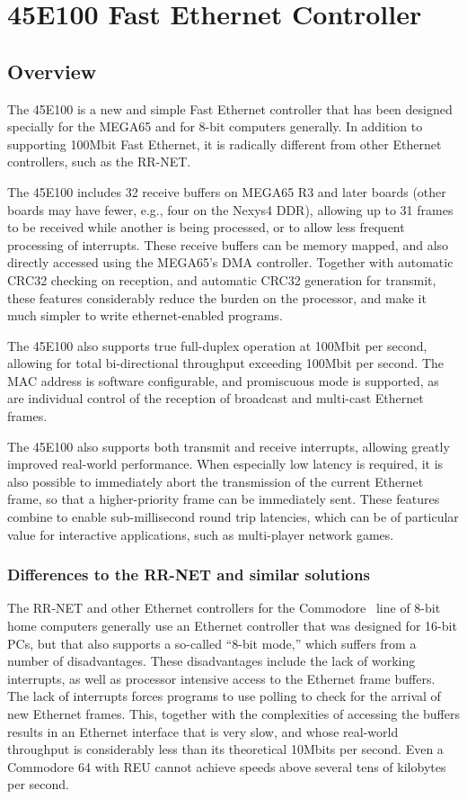 \chapter{45E100 Fast Ethernet Controller}

\section{Overview}

The 45E100 is a new and simple Fast Ethernet controller that has been
designed specially for the MEGA65 and for 8-bit computers generally.
In addition to supporting 100Mbit Fast Ethernet, it is radically
different from other Ethernet controllers, such as the RR-NET.

The 45E100 includes 32 receive buffers on MEGA65 R3 and later boards (other boards may have fewer, e.g., four on the Nexys4 DDR), allowing up to 31 frames to be
received while another is being processed, or to allow less frequent processing of interrupts.
These receive buffers can be memory mapped, and also directly accessed using the MEGA65's DMA controller.
Together with automatic CRC32 checking on reception, and automatic CRC32 generation for transmit, these features considerably
reduce the burden on the processor, and make it much simpler to write ethernet-enabled programs.

The 45E100 also supports true
full-duplex operation at 100Mbit per second, allowing for total bi-directional
throughput exceeding 100Mbit per second.  The MAC address is software
configurable, and promiscuous mode is supported, as are individual control
of the reception of broadcast and multi-cast Ethernet frames.

The 45E100 also
supports both transmit and receive interrupts, allowing greatly improved
real-world performance. When especially low latency is required, it is also possible
to immediately abort the transmission of the current Ethernet frame, so that a
higher-priority frame can be immediately sent.
These features combine to enable sub-millisecond round trip latencies,
which can be of particular value for interactive applications, such as multi-player network
games.

\subsection{Differences to the RR-NET and similar solutions}

The RR-NET and other Ethernet controllers for the Commodore\texttrademark{} \ line
of 8-bit home computers generally use an Ethernet controller that was
designed for 16-bit PCs, but that also supports a so-called ``8-bit mode,''
which suffers from a number of disadvantages. These disadvantages
include the lack of working interrupts, as well as processor intensive access to
the Ethernet frame buffers.  The lack of interrupts forces programs to
use polling to check for the arrival of new Ethernet frames.  This,
together with the complexities of accessing the buffers results in an
Ethernet interface that is very slow, and whose real-world throughput
is considerably less than its theoretical 10Mbits per second.  Even
a Commodore 64 with REU cannot achieve speeds above several tens of
kilobytes per second.

